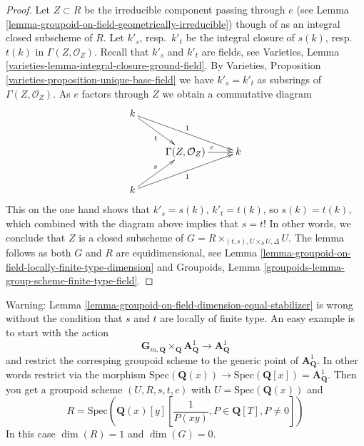 \begin{proof}
Let $Z \subset R$ be the irreducible component passing through $e$ (see
Lemma \ref{lemma-groupoid-on-field-geometrically-irreducible})
though of as an integral closed subscheme of $R$.
Let $k'_s$, resp.\ $k'_t$ be the integral closure of
$s(k)$, resp.\ $t(k)$ in $\Gamma(Z, \mathcal{O}_Z)$.
Recall that $k'_s$ and $k'_t$ are fields, see
Varieties, Lemma \ref{varieties-lemma-integral-closure-ground-field}.
By
Varieties, Proposition \ref{varieties-proposition-unique-base-field}
we have $k'_s = k'_t$ as subsrings of $\Gamma(Z, \mathcal{O}_Z)$.
As $e$ factors through $Z$ we obtain a commutative diagram
$$
\xymatrix{
k \ar[rd]_t \ar[rrd]^1 \\
& \Gamma(Z, \mathcal{O}_Z) \ar[r]^e & k \\
k \ar[ru]^s \ar[rru]_1
}
$$
This on the one hand shows that $k'_s = s(k)$, $k'_t = t(k)$, so
$s(k) = t(k)$, which combined with the diagram above implies
that $s = t$! In other words, we conclude that $Z$ is a closed
subscheme of $G = R \times_{(t, s), U \times_S U, \Delta} U$.
The lemma follows as both $G$ and $R$ are equidimensional, see
Lemma \ref{lemma-groupoid-on-field-locally-finite-type-dimension} and
Groupoids, Lemma \ref{groupoids-lemma-group-scheme-finite-type-field}.
\end{proof}

\begin{remark}
\label{remark-warn-dimension-groupoid-on-field}
Warning:
Lemma \ref{lemma-groupoid-on-field-dimension-equal-stabilizer}
is wrong without the condition that $s$ and $t$ are locally of
finite type.
An easy example is to start with the action
$$
\mathbf{G}_{m, \mathbf{Q}} \times_{\mathbf{Q}} \mathbf{A}^1_{\mathbf{Q}}
\to \mathbf{A}^1_{\mathbf{Q}}
$$
and restrict the corresping groupoid scheme to the generic point of
$\mathbf{A}^1_{\mathbf{Q}}$. In other words restrict via the morphism
$\text{Spec}(\mathbf{Q}(x)) \to
\text{Spec}(\mathbf{Q}[x]) = \mathbf{A}^1_{\mathbf{Q}}$.
Then you get a groupoid scheme
$(U, R, s, t, c)$ with
$U = \text{Spec}(\mathbf{Q}(x))$
and
$$
R = \text{Spec}\left(
\mathbf{Q}(x)[y]\left[
\frac{1}{P(xy)}, P \in \mathbf{Q}[T], P \not = 0
\right]
\right)
$$
In this case $\dim(R) = 1$ and $\dim(G) = 0$.
\end{remark}















